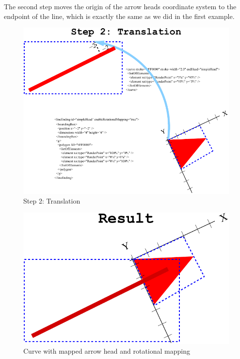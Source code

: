 The second step moves the origin of the arrow heads coordinate system to the endpoint of the line, which is exactly the same as we did in the first example.

\begin{figure}[!h]
\begin{center}
\includegraphics{figures/ArrowHeadMapping4.pdf}
\end{center}
\caption{Step 2: Translation}
\label{ArrowHeadMapping4}
\end{figure}

\begin{figure}[!h]
\begin{center}
\includegraphics{figures/ArrowHeadMapping5.pdf}
\end{center}
\caption{Curve with mapped arrow head and rotational mapping}
\label{ArrowHeadMapping5}
\end{figure}

